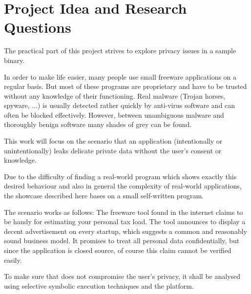 \section{Project Idea and Research Questions}\label{sec:proj}

The practical part of this project strives to explore privacy issues in a sample binary.

In order to make life easier, many people use small freeware applications on a regular basis.
But most of these programs are proprietary and have to be trusted without any knowledge of their functioning.
Real malware (Trojan horses, spyware, ...) is usually detected rather quickly by anti-virus software and can often be blocked effectively.
However, between unambiguous malware and thoroughly benign software many shades of grey can be found.

This work will focus on the scenario that an application (intentionally or unintentionally) leaks delicate private data without the user's consent or knowledge.


Due to the difficulty of finding a real-world program which shows exactly this desired behaviour and also in general the complexity of real-world applications, the showcase described here bases on a small self-written program.

The scenario works as follows: The freeware tool \app found in the internet claims to be handy for estimating your personal tax load.
The tool announces to display a decent advertisement on every startup, which suggests a common and reasonably sound business model.
It promises to treat all personal data confidentially, but since the application is closed source, of course this claim cannot be verified easily.

To make sure that \app does not compromise the user's privacy, it shall be analysed using selective symbolic execution techniques and the \sse platform.

